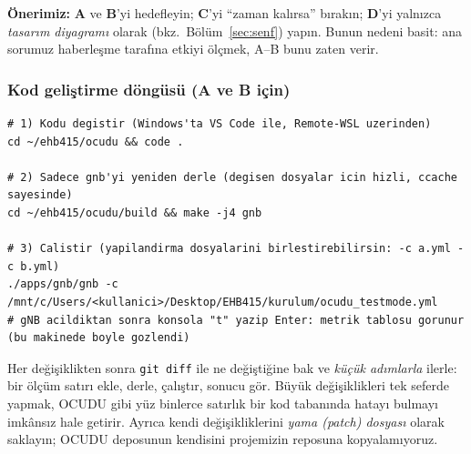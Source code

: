 \textbf{Önerimiz:} \textbf{A} ve \textbf{B}'yi hedefleyin; \textbf{C}'yi ``zaman kalırsa'' bırakın; \textbf{D}'yi yalnızca \emph{tasarım diyagramı} olarak (bkz.\ Bölüm~\ref{sec:senf}) yapın.
Bunun nedeni basit: ana sorumuz haberleşme tarafına etkiyi ölçmek, A--B bunu zaten verir.

\subsubsection{Kod geliştirme döngüsü (A ve B için)}

\begin{lstlisting}
# 1) Kodu degistir (Windows'ta VS Code ile, Remote-WSL uzerinden)
cd ~/ehb415/ocudu && code .

# 2) Sadece gnb'yi yeniden derle (degisen dosyalar icin hizli, ccache sayesinde)
cd ~/ehb415/ocudu/build && make -j4 gnb

# 3) Calistir (yapilandirma dosyalarini birlestirebilirsin: -c a.yml -c b.yml)
./apps/gnb/gnb -c /mnt/c/Users/<kullanici>/Desktop/EHB415/kurulum/ocudu_testmode.yml
# gNB acildiktan sonra konsola "t" yazip Enter: metrik tablosu gorunur (bu makinede boyle gozlendi)
\end{lstlisting}

\begin{dikkat}
Her değişiklikten sonra \texttt{git diff} ile ne değiştiğine bak ve \emph{küçük adımlarla} ilerle: bir ölçüm satırı ekle, derle, çalıştır, sonucu gör. Büyük değişiklikleri tek seferde yapmak,
OCUDU gibi yüz binlerce satırlık bir kod tabanında hatayı bulmayı imkânsız hale getirir. Ayrıca kendi değişikliklerini \emph{yama (patch) dosyası} olarak saklayın; OCUDU deposunun kendisini projemizin reposuna kopyalamıyoruz.
\end{dikkat}
